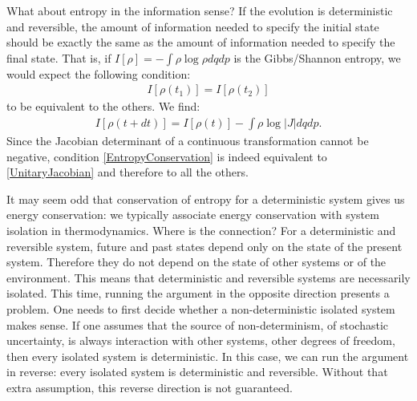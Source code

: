 \documentclass[10pt,twocolumn, nofootinbib]{revtex4-2}
\begin{document}
What about entropy in the information sense? If the evolution is deterministic and reversible, the amount of information needed to specify the initial state should be exactly the same as the amount of information needed to specify the final state. That is, if $I[\rho] = - \int \rho \log \rho dqdp$ is the Gibbs/Shannon entropy, we would expect the following condition:
\begin{align}\label{EntropyConservation}
	I[\rho(t_1)] = I[\rho(t_2)]
\end{align}
to be equivalent to the others. We find:
\begin{align}
	I[\rho(t + dt)] = I[\rho(t)] - \int \rho \log |J| dqdp.
\end{align}
Since the Jacobian determinant of a continuous transformation cannot be negative, condition \eqref{EntropyConservation} is indeed equivalent to \eqref{UnitaryJacobian} and therefore to all the others.

It may seem odd that conservation of entropy for a deterministic system gives us energy conservation: we typically associate energy conservation with system isolation in thermodynamics. Where is the connection? For a deterministic and reversible system, future and past states depend only on the state of the present system. Therefore they do not depend on the state of other systems or of the environment. This means that deterministic and reversible systems are necessarily isolated. This time, running the argument in the opposite direction presents a problem. One needs to first decide whether a non-deterministic isolated system makes sense. If one assumes that the source of non-determinism, of stochastic uncertainty, is always interaction with other systems, other degrees of freedom, then every isolated system is deterministic. In this case, we can run the argument in reverse: every isolated system is deterministic and reversible. Without that extra assumption, this reverse direction is not guaranteed.
\end{document}
